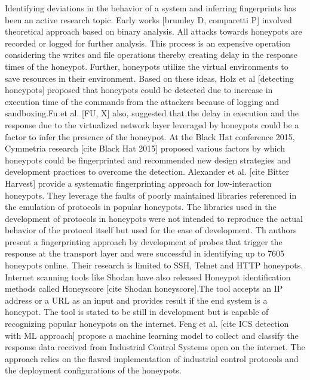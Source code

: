 \documentclass[letterpaper, 10 pt, conference]{ieeeconf}  %
\begin{document}
Identifying deviations in the behavior of a system and inferring fingerprints has been an active research topic. Early works [brumley D, comparetti P] involved theoretical approach based on binary analysis. All attacks towards honeypots are recorded or logged for further analysis. This process is an expensive operation considering the writes and file operations thereby creating delay in the response times of the honeypot. Further, honeypots utilize the virtual environments to save resources in their environment. Based on these ideas, Holz et al [detecting honeypots] proposed that honeypots could be detected due to increase in execution time of the commands from the attackers because of logging and sandboxing.Fu et al. [FU, X] also, suggested that the delay in execution and the response due to the virtualized network layer leveraged by honeypots could be a factor to infer the presence of the honeypot. At the Black Hat conference 2015, Cymmetria research [cite Black Hat 2015] proposed various factors by which honeypots could be fingerprinted and recommended new design strategies and development practices to overcome the detection. Alexander et al. [cite Bitter Harvest] provide a systematic fingerprinting approach for low-interaction honeypots. They leverage the faults of poorly maintained libraries referenced in the emulation of protocols in popular honeypots. The libraries used in the development of protocols in honeypots were not intended to reproduce the actual behavior of the protocol itself but used for the ease of development. Th authors present a fingerprinting approach by development of probes that trigger the response at the transport layer and were successful in identifying up to 7605 honeypots online. Their research is limited to SSH, Telnet and HTTP honeypots. Internet scanning tools like Shodan have also released Honeypot identification methods called Honeyscore [cite Shodan honeyscore].The tool accepts an IP address or a URL as an input and provides result if the end system is a honeypot. The tool is stated to be still in development but is capable of recognizing popular honeypots on the internet. Feng et al. [cite ICS detection with ML approach] propose a machine learning model to collect and classify the response data received from Industrial Control Systems open on the internet. The approach relies on the flawed implementation of industrial control protocols and the deployment configurations of the honeypots. 
\end{document}
